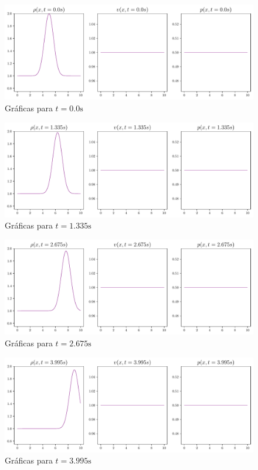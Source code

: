 \begin{figure}[ht]
	\centering
	\includegraphics[width=1.1\linewidth]{../euler1D/plots_en_TDG/set1/graficas/1.pdf}
	\caption{Gráficas para $t=0.0\unit{\s}$}
\end{figure}
\begin{figure}[ht]
	\includegraphics[width=1.1\linewidth]{../euler1D/plots_en_TDG/set1/graficas/135.pdf}
	\caption{Gráficas para $t=1.335\unit{\s}$}
\end{figure}\vspace{\baselineskip}
\begin{figure}[ht]
	\includegraphics[width=1.1\linewidth]{../euler1D/plots_en_TDG/set1/graficas/269.pdf}
	\caption{Gráficas para $t=2.675\unit{\s}$}
\end{figure}\vspace{\baselineskip}
\begin{figure}[ht]
	\includegraphics[width=1.1\linewidth]{../euler1D/plots_en_TDG/set1/graficas/401.pdf}
	\caption{Gráficas para $t=3.995\unit{\s}$}
\end{figure}
\clearpage
